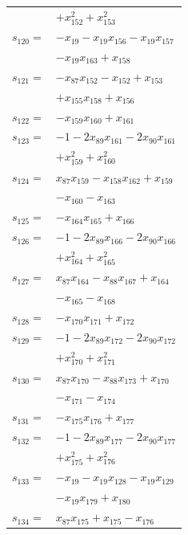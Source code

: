 \begin{longtable}{@{}r@{\;}l@{}}
 & \(\displaystyle +x_{152}^{2} +x_{153}^{2}\) \\[3pt]
\(s_{120}=\) & \(\displaystyle -x_{19} -x_{19}x_{156} -x_{19}x_{157}\) \\
 & \(\displaystyle -x_{19}x_{163} +x_{158}\) \\[3pt]
\(s_{121}=\) & \(\displaystyle -x_{87}x_{152} -x_{152} +x_{153}\) \\
 & \(\displaystyle +x_{155}x_{158} +x_{156}\) \\[3pt]
\(s_{122}=\) & \(\displaystyle -x_{159}x_{160} +x_{161}\) \\[3pt]
\(s_{123}=\) & \(\displaystyle -1 -2x_{89}x_{161} -2x_{90}x_{161}\) \\
 & \(\displaystyle +x_{159}^{2} +x_{160}^{2}\) \\[3pt]
\(s_{124}=\) & \(\displaystyle x_{87}x_{159} -x_{158}x_{162} +x_{159}\) \\
 & \(\displaystyle -x_{160} -x_{163}\) \\[3pt]
\(s_{125}=\) & \(\displaystyle -x_{164}x_{165} +x_{166}\) \\[3pt]
\(s_{126}=\) & \(\displaystyle -1 -2x_{89}x_{166} -2x_{90}x_{166}\) \\
 & \(\displaystyle +x_{164}^{2} +x_{165}^{2}\) \\[3pt]
\(s_{127}=\) & \(\displaystyle x_{87}x_{164} -x_{88}x_{167} +x_{164}\) \\
 & \(\displaystyle -x_{165} -x_{168}\) \\[3pt]
\(s_{128}=\) & \(\displaystyle -x_{170}x_{171} +x_{172}\) \\[3pt]
\(s_{129}=\) & \(\displaystyle -1 -2x_{89}x_{172} -2x_{90}x_{172}\) \\
 & \(\displaystyle +x_{170}^{2} +x_{171}^{2}\) \\[3pt]
\(s_{130}=\) & \(\displaystyle x_{87}x_{170} -x_{88}x_{173} +x_{170}\) \\
 & \(\displaystyle -x_{171} -x_{174}\) \\[3pt]
\(s_{131}=\) & \(\displaystyle -x_{175}x_{176} +x_{177}\) \\[3pt]
\(s_{132}=\) & \(\displaystyle -1 -2x_{89}x_{177} -2x_{90}x_{177}\) \\
 & \(\displaystyle +x_{175}^{2} +x_{176}^{2}\) \\[3pt]
\(s_{133}=\) & \(\displaystyle -x_{19} -x_{19}x_{128} -x_{19}x_{129}\) \\
 & \(\displaystyle -x_{19}x_{179} +x_{180}\) \\[3pt]
\(s_{134}=\) & \(\displaystyle x_{87}x_{175} +x_{175} -x_{176}\) \\

\end{longtable}
